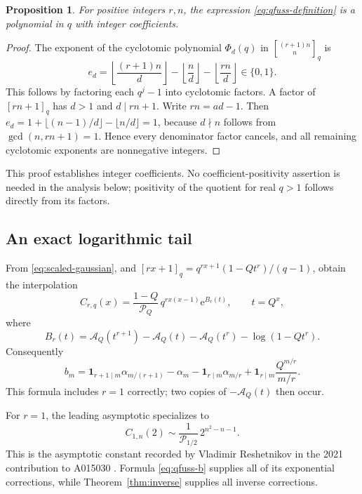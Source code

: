 \documentclass[11pt]{article}
\numberwithin{equation}{section}
\newtheorem{proposition}[theorem]{Proposition}
\theoremstyle{definition}
\newcommand{\qbin}[2]{\genfrac{[}{]}{0pt}{}{#1}{#2}_{q}}
\newcommand{\Pinf}{\mathcal P_Q}
\newcommand{\A}{\mathcal A_Q}
\newcommand{\ee}{\mathrm e}
\newcommand{\one}{\mathbf 1}
\begin{document}
\begin{proposition}\label{prop:qfuss-polynomial}
For positive integers $r,n$, the expression \eqref{eq:qfuss-definition} is a polynomial in $q$ with integer coefficients.
\end{proposition}
\begin{proof}
The exponent of the cyclotomic polynomial $\Phi_d(q)$ in
$\qbin{(r+1)n}{n}$ is
\[
 e_d=\left\lfloor\frac{(r+1)n}{d}\right\rfloor
     -\left\lfloor\frac n d\right\rfloor
     -\left\lfloor\frac{rn}{d}\right\rfloor\in\{0,1\}.
\]
This follows by factoring each $q^j-1$ into cyclotomic factors. A factor of $[rn+1]_q$ has $d>1$ and $d\mid rn+1$. Write $rn=ad-1$. Then
$e_d=1+\lfloor(n-1)/d\rfloor-\lfloor n/d\rfloor=1$, because $d\nmid n$ follows from $\gcd(n,rn+1)=1$. Hence every denominator factor cancels, and all remaining cyclotomic exponents are nonnegative integers.
\end{proof}
This proof establishes integer coefficients. No coefficient-positivity assertion is needed in the analysis below; positivity of the quotient for real $q>1$ follows directly from its factors.

\subsection{An exact logarithmic tail}

From \eqref{eq:scaled-gaussian}, and
$[rx+1]_q=q^{rx+1}(1-Qt^r)/(q-1)$, obtain the interpolation
\begin{equation}\label{eq:qfuss-interp}
 C_{r,q}(x)=\frac{1-Q}{\Pinf}\,q^{r x(x-1)}\ee^{B_r(t)},
 \qquad t=Q^x,
\end{equation}
where
\begin{equation}\label{eq:qfuss-B}
 B_r(t)=\A(t^{r+1})-\A(t)-\A(t^r)-\log(1-Qt^r).
\end{equation}
Consequently
\begin{equation}\label{eq:qfuss-b}
 b_m=\one_{r+1\mid m}\alpha_{m/(r+1)}-\alpha_m
 -\one_{r\mid m}\alpha_{m/r}
 +\one_{r\mid m}\frac{Q^{m/r}}{m/r}.
\end{equation}
This formula includes $r=1$ correctly; two copies of $-\A(t)$ then occur.

For $r=1$, the leading asymptotic specializes to
\begin{equation}\label{eq:qCatalan-leading}
 C_{1,n}(2)\sim\frac1{\mathcal P_{1/2}}\,2^{n^2-n-1}.
\end{equation}
This is the asymptotic constant recorded by Vladimir Reshetnikov in the 2021 contribution to A015030 \cite{oeiscatalan}. Formula \eqref{eq:qfuss-b} supplies all of its exponential corrections, while Theorem~\ref{thm:inverse} supplies all inverse corrections.
\end{document}
